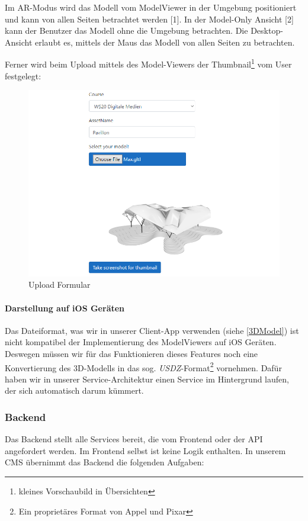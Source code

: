 \documentclass[titlepage, a4paper, 11pt]{scrartcl}
\begin{document}
          Im AR-Modus wird das Modell vom ModelViewer in der Umgebung positioniert und kann von allen Seiten betrachtet werden [1]. 
          In der Model-Only Ansicht [2] kann der Benutzer das Modell ohne die Umgebung betrachten.
          Die Desktop-Ansicht erlaubt es, mittels der Maus das Modell von allen Seiten zu betrachten.

          Ferner wird beim Upload mittels des Model-Viewers der Thumbnail\footnote{kleines Vorschaubild in Übersichten} vom User festgelegt:
          
          \begin{figure}[H]
            \centering
            \includegraphics[width=.6\textwidth]{UploadForm.PNG}
            \caption{Upload Formular}
            \label{createThumb}
          \end{figure}

        \paragraph{Darstellung auf iOS Geräten}

          Das Dateiformat, was wir in unserer Client-App verwenden (siehe \ref{3DModel}) ist nicht kompatibel der Implementierung des ModelViewers auf iOS Geräten.
          Deswegen müssen wir für das Funktionieren dieses Features noch eine Konvertierung des 3D-Modells in das sog. \textit{USDZ}-Format\footnote{Ein proprietäres Format von Appel und Pixar} vornehmen.
          Dafür haben wir in unserer Service-Architektur einen Service im Hintergrund laufen, der sich automatisch darum kümmert.

      \subsubsection{Backend}

        Das Backend stellt alle Services bereit, die vom Frontend oder der API angefordert werden. Im Frontend selbst ist keine Logik enthalten. 
        In unserem CMS übernimmt das Backend die folgenden Aufgaben:
\end{document}
